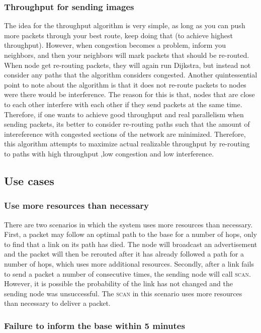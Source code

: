 \documentclass[letterpaper]{article}
\begin{document}
\subsubsection{Throughput for sending images}

The idea for the throughput algorithm is very simple, as long as you can push more packets through your best route, keep doing that (to achieve highest throughput). However, when congestion becomes a problem, inform you neighbors, and then your neighbors will mark packets that should be re-routed. When node get re-routing packets, they will again run Dijkstra, but instead not consider any paths that the algorithm considers congested. Another quintessential point to note about the algorithm is that it does not re-route packets to nodes were there would be interference. The reason for this is that, nodes that are close to each other interfere with each other if they send packets at the same time. Therefore, if one wants to achieve good throughput and real parallelism when sending packets, its better to consider re-routing paths such that the amount of intereference with congested sections of the network are minimized. Therefore, this algorithm attempts to maximize actual realizable throughput by re-routing to paths with high throughput ,low congestion and low interference.


\subsection{Use cases}

\subsubsection{Use more resources than necessary}

There are two scenarios in which the system uses more resources than necessary. First, a packet may follow an optimal path
to the base for a number of hops, only to find that a link on its path has died. The node will broadcast an advertisement
and the packet will then be rerouted after it has already followed a path for a number of hops, which uses more additional
resources. Secondly, after a link fails to send a packet a number of consecutive times, the sending node will call
\textsc{scan}. However, it is possible the probability of the link has not changed and the sending node was unsuccessful.
The \textsc{scan} in this scenario uses more resources than necessary to deliver a packet.

\subsubsection{Failure to inform the base within 5 minutes}
\end{document}
